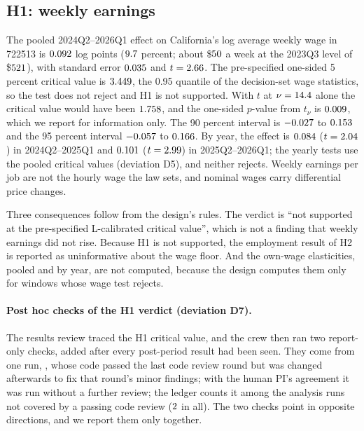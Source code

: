 \subsection{H1: weekly earnings}
\label{sec:res-h1}

The pooled 2024Q2--2026Q1 effect on California's log average weekly wage in 722513 is $0.092$
log points ($9.7$ percent; about \$$50$ a week at the 2023Q3 level of
\$$521$), with standard error $0.035$ and $t = 2.66$. The pre-specified one-sided 5
percent critical value is $3.449$, the 0.95 quantile of the decision-set wage statistics, so
the test does not reject and H1 is not supported. With $t$ at $\nu = 14.4$ alone the critical
value would have been $1.758$, and the one-sided $p$-value from $t_\nu$ is
$0.009$, which we report for information only. The 90 percent interval is $-0.027$
to $0.153$ and the 95 percent interval $-0.057$ to $0.166$. By year,
the effect is $0.084$ ($t = 2.04$) in 2024Q2--2025Q1 and $0.101$
($t = 2.99$) in 2025Q2--2026Q1; the yearly tests use the pooled critical values (deviation
D5), and neither rejects. Weekly earnings per job are not the hourly wage the law sets, and nominal
wages carry differential price changes.

Three consequences follow from the design's rules. The verdict is ``not supported at the
pre-specified L-calibrated critical value'', which is not a finding that weekly earnings did not
rise. Because H1 is not supported, the employment result of H2 is reported as uninformative about
the wage floor. And the own-wage elasticities, pooled and by year, are not computed, because the
design computes them only for windows whose wage test rejects.

\paragraph{Post hoc checks of the H1 verdict (deviation D7).}
\label{sec:res-posthoc}
The results review traced the H1 critical value, and the crew then ran two report-only checks,
added after every post-period result had been seen. They come from one run, , whose
code passed the last code review round but was changed afterwards to fix that round's minor
findings; with the human PI's agreement it was run without a further review; the ledger counts it among the analysis runs not covered by a passing
code review ($2$ in all). The two
checks point in opposite directions, and we report them only together.

